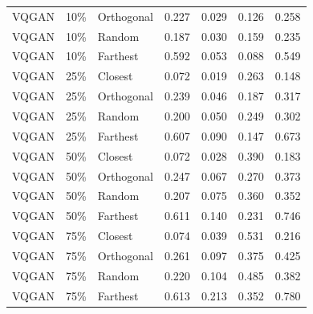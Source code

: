 \begin{longtable}{lllrrrr}
VQGAN & 10\% & Orthogonal & 0.227 & 0.029 & 0.126 & 0.258 \\
VQGAN & 10\% & Random & 0.187 & 0.030 & 0.159 & 0.235 \\
VQGAN & 10\% & Farthest & 0.592 & 0.053 & 0.088 & 0.549 \\
VQGAN & 25\% & Closest & 0.072 & 0.019 & 0.263 & 0.148 \\
VQGAN & 25\% & Orthogonal & 0.239 & 0.046 & 0.187 & 0.317 \\
VQGAN & 25\% & Random & 0.200 & 0.050 & 0.249 & 0.302 \\
VQGAN & 25\% & Farthest & 0.607 & 0.090 & 0.147 & 0.673 \\
VQGAN & 50\% & Closest & 0.072 & 0.028 & 0.390 & 0.183 \\
VQGAN & 50\% & Orthogonal & 0.247 & 0.067 & 0.270 & 0.373 \\
VQGAN & 50\% & Random & 0.207 & 0.075 & 0.360 & 0.352 \\
VQGAN & 50\% & Farthest & 0.611 & 0.140 & 0.231 & 0.746 \\
VQGAN & 75\% & Closest & 0.074 & 0.039 & 0.531 & 0.216 \\
VQGAN & 75\% & Orthogonal & 0.261 & 0.097 & 0.375 & 0.425 \\
VQGAN & 75\% & Random & 0.220 & 0.104 & 0.485 & 0.382 \\
VQGAN & 75\% & Farthest & 0.613 & 0.213 & 0.352 & 0.780 \\
\end{longtable}
\endgroup

